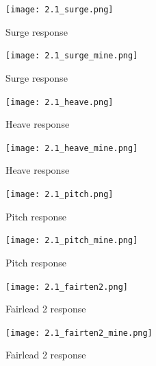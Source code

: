 \documentclass[a4paper, 11pt]{article}
\begin{document}
\begin{figure}[H]
    \begin{minipage}{0.48\textwidth}
        \centering
        \texttt{[image: 2.1\_surge.png]}
        \caption{\small Surge response \cite{Robertson2014}}
        \label{fig:2.1_surge}
    \end{minipage}
    \hfill
    \begin{minipage}{0.51\textwidth}
        \centering
        \texttt{[image: 2.1\_surge\_mine.png]}
        \caption{\small Surge response}
        \label{fig:2.1_surge_mine}
    \end{minipage}
\end{figure}
\vspace{-0.2cm}
\begin{figure}[H]
    \begin{minipage}{0.48\textwidth}
        \centering
        \texttt{[image: 2.1\_heave.png]}
        \caption{\small Heave response \cite{Robertson2014}}
        \label{fig:2.1_heave}
    \end{minipage}
    \hfill
    \begin{minipage}{0.51\textwidth}
        \centering
        \texttt{[image: 2.1\_heave\_mine.png]}
        \caption{\small Heave response}
        \label{fig:2.1_heave_mine}
    \end{minipage}
\end{figure}

\begin{figure}[H]
    \begin{minipage}{0.48\textwidth}
        \centering
        \texttt{[image: 2.1\_pitch.png]}
        \caption{\small Pitch response \cite{Robertson2014}}
        \label{fig:2.1_pitch}
    \end{minipage}
    \hfill
    \begin{minipage}{0.51\textwidth}
        \centering
        \texttt{[image: 2.1\_pitch\_mine.png]}
        \caption{\small Pitch response}
        \label{fig:2.1_pitch_mine}
    \end{minipage}
\end{figure}

\begin{figure}[H]
    \begin{minipage}{0.48\textwidth}
        \centering
        \texttt{[image: 2.1\_fairten2.png]}
        \caption{\small Fairlead 2 response \cite{Robertson2014}}
        \label{fig:2.1_fairten2}
    \end{minipage}
    \hfill
    \begin{minipage}{0.51\textwidth}
        \centering
        \texttt{[image: 2.1\_fairten2\_mine.png]}
        \caption{\small Fairlead 2 response}
        \label{fig:2.1_fairten2_mine}
    \end{minipage}
\end{figure}
\end{document}
